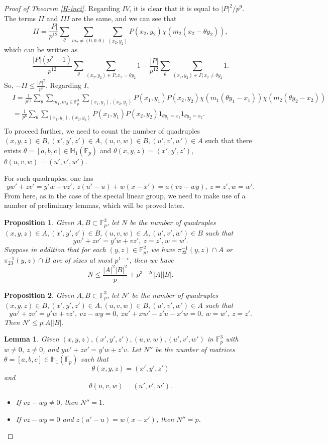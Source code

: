\documentclass[10pt,a4paper]{amsart}
\newtheorem{proposition}{Proposition}
\newtheorem{lemma}{Lemma}
\def\Fbb{\mathbb{F}}
\begin{document}
\begin{proof}[Proof of Theorem \ref{H-inci}]
Regarding $IV$, it is clear that it is equal to $|P|^2/p^9$. The terms $II$ and $III$ are the same, and we can see that 
\[II=\frac{|P|}{p^{12}}\sum_{\theta}\sum_{m_2\ne (0, 0, 0)}\sum_{(x_2, y_2)}P(x_2, y_2)\chi(m_2(x_2-\theta y_2)),\]
which can be written as 
\[\frac{|P|(p^2-1)}{p^{12}}\sum_{\theta}\sum_{(x_2, y_2)\in P, x_2=\theta y_2} 1-\frac{|P|}{p^{12}}\sum_{\theta}\sum_{(x_2, y_2)\in P, x_2\ne\theta y_2}1.\]
So, $-II\le \frac{|P|^2}{p^9}$.
Regarding $I$,
\begin{align*}
    &I=\frac{1}{p^{12}}\sum_{\theta}\sum_{m_1, m_2\in \mathbb{F}_p^3}\sum_{(x_1, y_1), (x_2, y_2)}P(x_1, y_1)P(x_2, y_2)\chi(m_1(\theta y_1-x_1))\chi(m_2(\theta y_2-x_2))\\
    &=\frac{1}{p^6}\sum_{\theta}\sum_{(x_1, y_1), (x_2, y_2)}P(x_1, y_1)P(x_2, y_2)1_{\theta y_1=x_1}1_{\theta y_2=x_2}.\\
\end{align*}
To proceed further, we need to count the number of quadruples $(x, y, z)\in B, (x', y', z')\in A, (u, v, w)\in B, (u', v', w')\in A$ such that there exists $\theta=[a, b, c]\in \mathbb{H}_1(\Fbb_p)$ and $\theta (x, y, z)=(x', y', z')$, ~$\theta(u, v, w)=(u', v', w')$.

For such quadruples, one has 
\[yw'+zv'=y'w+vz', ~z(u'-u)+w(x-x')=a(vz-wy), ~z=z', w=w'.\]
From here, as in the case of the special linear group, we need to make use of a number of preliminary lemmas, which will be proved later.
\begin{proposition}\label{propo2.1}
Given $A, B\subset \mathbb{F}_p^3$, let $N$ be the number of quadruples $(x, y, z)\in A, (x', y', z')\in B, (u, v, w)\in A, (u', v', w')\in B$ such that 
\[yw'+zv'=y'w+vz', ~z=z', w=w'.\]
Suppose in addition that for each $(y, z)\in \mathbb{F}_p^2$, we have $\pi_{23}^{-1}(y, z)\cap A$ or $\pi_{23}^{-1}(y, z)\cap B$ are of sizes at most $p^{1-\epsilon}$, then we have 
\[N\le \frac{|A|^2|B|^2}{p}+p^{3-2\epsilon}|A||B|.\]
\end{proposition}
\begin{proposition}\label{propo2.2}
    Given $A, B\subset \mathbb{F}_p^3$, let $N'$ be the number of quadruples $(x, y, z)\in B, (x', y', z')\in A, (u, v, w)\in B, (u', v', w')\in A$ such that 
\[yw'+zv'=y'w+vz', ~vz-wy=0, ~zu'+xw'-z'u-x'w=0, ~w=w',~z=z'.\]
Then $N'\le p|A||B|$.
\end{proposition}
\begin{lemma}\label{lm23}
    Given $(x, y, z), (x', y', z'), (u, v, w), (u', v', w')$ in $\mathbb{F}_p^3$ with $w\ne 0$, $z\ne 0$, and $yw'+zv'=y'w+z'v$. Let $N''$ be the number of matrices $\theta=[a, b, c]\in \mathbb{H}_1(\Fbb_p)$ such that 
\[\theta(x, y, z)=(x', y', z')\]
and 
\[\theta(u, v, w)=(u', v', w').\]
\begin{itemize}
    \item If $vz-wy\ne 0$, then $N''=1$. 
    \item If $vz-wy=0$ and $z(u'-u)=w(x-x')$, then $N''=p$.


\end{itemize}
\end{lemma}
\end{proof}
\end{document}
